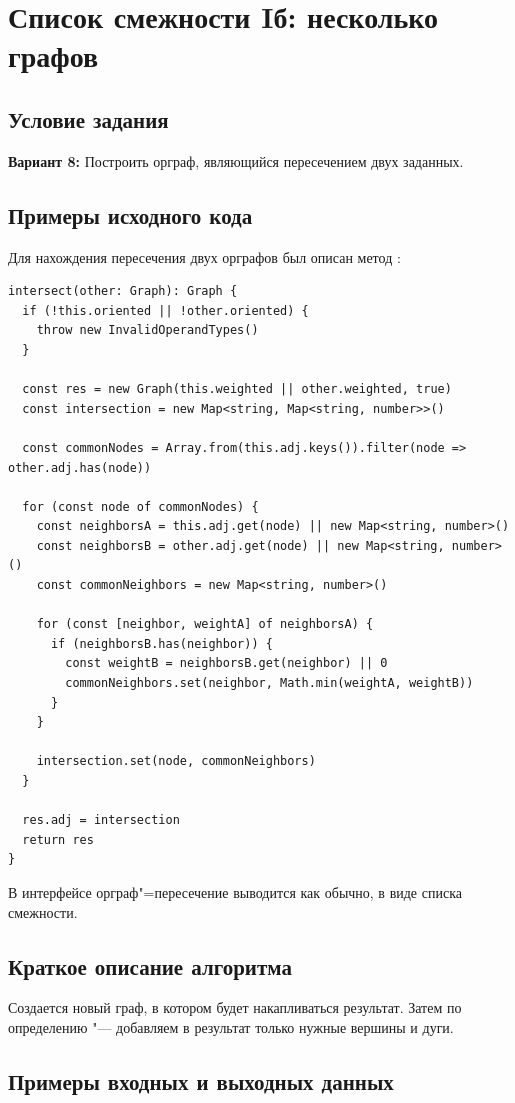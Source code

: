 \section{Список смежности Iб: несколько графов}
\subsection{Условие задания}
\textbf{Вариант 8:} Построить орграф, являющийся пересечением двух заданных.

\subsection{Примеры исходного кода}
Для нахождения пересечения двух орграфов был описан метод :
\begin{verbatim}
intersect(other: Graph): Graph {
  if (!this.oriented || !other.oriented) {
    throw new InvalidOperandTypes()
  }

  const res = new Graph(this.weighted || other.weighted, true)
  const intersection = new Map<string, Map<string, number>>()

  const commonNodes = Array.from(this.adj.keys()).filter(node => other.adj.has(node))

  for (const node of commonNodes) {
    const neighborsA = this.adj.get(node) || new Map<string, number>()
    const neighborsB = other.adj.get(node) || new Map<string, number>()
    const commonNeighbors = new Map<string, number>()

    for (const [neighbor, weightA] of neighborsA) {
      if (neighborsB.has(neighbor)) {
        const weightB = neighborsB.get(neighbor) || 0
        commonNeighbors.set(neighbor, Math.min(weightA, weightB))
      }
    }

    intersection.set(node, commonNeighbors)
  }

  res.adj = intersection
  return res
}
\end{verbatim}

В интерфейсе орграф"=пересечение выводится как обычно, в виде списка смежности.

\subsection{Краткое описание алгоритма}
Создается новый граф, в котором будет накапливаться результат. Затем
по определению "--- добавляем в результат только нужные вершины и дуги.

\subsection{Примеры входных и выходных данных}

